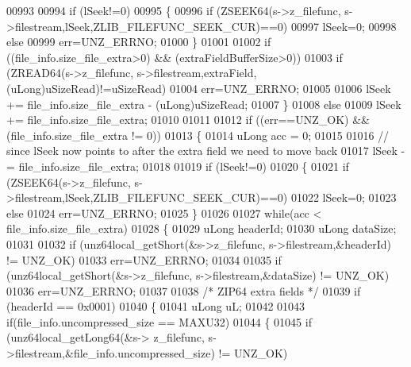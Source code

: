 \begin{DoxyCode}
00993 
00994         \textcolor{keywordflow}{if} (lSeek!=0)
00995         \{
00996             \textcolor{keywordflow}{if} (ZSEEK64(s->z\_filefunc, s->filestream,lSeek,ZLIB\_FILEFUNC\_SEEK\_CUR)==0)
00997                 lSeek=0;
00998             \textcolor{keywordflow}{else}
00999                 err=UNZ\_ERRNO;
01000         \}
01001 
01002         \textcolor{keywordflow}{if} ((file\_info.size\_file\_extra>0) && (extraFieldBufferSize>0))
01003             \textcolor{keywordflow}{if} (ZREAD64(s->z\_filefunc, s->filestream,extraField,(uLong)uSizeRead)!=uSizeRead)
01004                 err=UNZ\_ERRNO;
01005 
01006         lSeek += file\_info.size\_file\_extra - (uLong)uSizeRead;
01007     \}
01008     \textcolor{keywordflow}{else}
01009         lSeek += file\_info.size\_file\_extra;
01010 
01011 
01012     \textcolor{keywordflow}{if} ((err==UNZ\_OK) && (file\_info.size\_file\_extra != 0))
01013     \{
01014                                 uLong acc = 0;
01015 
01016         \textcolor{comment}{// since lSeek now points to after the extra field we need to move back}
01017         lSeek -= file\_info.size\_file\_extra;
01018 
01019         \textcolor{keywordflow}{if} (lSeek!=0)
01020         \{
01021             \textcolor{keywordflow}{if} (ZSEEK64(s->z\_filefunc, s->filestream,lSeek,ZLIB\_FILEFUNC\_SEEK\_CUR)==0)
01022                 lSeek=0;
01023             \textcolor{keywordflow}{else}
01024                 err=UNZ\_ERRNO;
01025         \}
01026 
01027         \textcolor{keywordflow}{while}(acc < file\_info.size\_file\_extra)
01028         \{
01029             uLong headerId;
01030                                                 uLong dataSize;
01031 
01032             \textcolor{keywordflow}{if} (unz64local\_getShort(&s->z\_filefunc, s->filestream,&headerId) != UNZ\_OK)
01033                 err=UNZ\_ERRNO;
01034 
01035             \textcolor{keywordflow}{if} (unz64local\_getShort(&s->z\_filefunc, s->filestream,&dataSize) != UNZ\_OK)
01036                 err=UNZ\_ERRNO;
01037 
01038             \textcolor{comment}{/* ZIP64 extra fields */}
01039             \textcolor{keywordflow}{if} (headerId == 0x0001)
01040             \{
01041                                                         uLong uL;
01042 
01043                                                                 \textcolor{keywordflow}{if}(file\_info.uncompressed\_size == MAXU32)
01044                                                                 \{
01045                                                                         \textcolor{keywordflow}{if} (unz64local\_getLong64(&s->
      z\_filefunc, s->filestream,&file\_info.uncompressed\_size) != UNZ\_OK)

\end{DoxyCode}
